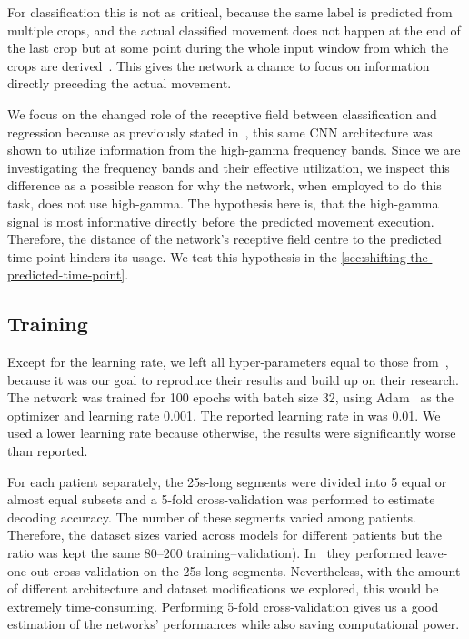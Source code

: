 For classification this is not as critical, because the same label is predicted from multiple crops, and the actual classified movement does not happen at the end of the last crop but at some point during the whole input window from which the crops are derived~\cite{schirrmeister-deep-2017}.
This gives the network a chance to focus on information directly preceding the actual movement.

We focus on the changed role of the receptive field between classification and regression because as previously stated in~\cite{schirrmeister-deep-2017, hartmann-hierarchical-2018}, this same CNN architecture was shown to utilize information from the high-gamma frequency bands.
Since we are investigating the frequency bands and their effective utilization, we inspect this difference as a possible reason for why the network, when employed to do this task, does not use high-gamma.
The hypothesis here is, that the high-gamma signal is most informative directly before the predicted movement execution.
Therefore, the distance of the network's receptive field centre to the predicted time-point hinders its usage.
We test this hypothesis in the \cref{sec:shifting-the-predicted-time-point}.

\subsection{Training}\label{subsec:training}
Except for the learning rate, we left all hyper-parameters equal to those from~\cite{Hammer-2021}, because it was our goal to reproduce their results and build up on their research.
The network was trained for 100 epochs with batch size 32, using Adam~\cite{kingma-adam-2017} as the optimizer and learning rate 0.001.
The reported learning rate in \cite{Hammer-2021} was 0.01.
We used a lower learning rate because otherwise, the results were significantly worse than reported.

For each patient separately, the 25s-long segments were divided into 5 equal or almost equal subsets and a 5-fold cross-validation was performed to estimate decoding accuracy.
The number of these segments varied among patients.
Therefore, the dataset sizes varied across models for different patients but the ratio was kept the same 80--200 training--validation).
In~\cite{Hammer-2021} they performed leave-one-out cross-validation on the 25s-long segments.
Nevertheless, with the amount of different architecture and dataset modifications we explored, this would be extremely time-consuming.
Performing 5-fold cross-validation gives us a good estimation of the networks' performances while also saving computational power.

